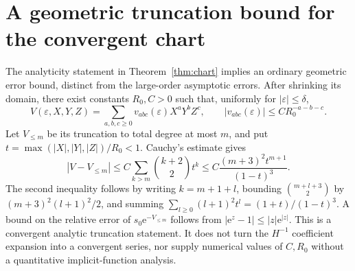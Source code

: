 \documentclass[11pt,a4paper]{article}
\numberwithin{equation}{section}
\theoremstyle{definition}
\theoremstyle{remark}
\newcommand{\eps}{\varepsilon}
\newcommand{\ee}{\mathrm e}
\begin{document}
\section{A geometric truncation bound for the convergent chart}
\label{app:chart}
The analyticity statement in Theorem~\ref{thm:chart} implies an ordinary
geometric error bound, distinct from the large-order asymptotic errors.
After shrinking its domain, there exist constants \(R_0,C>0\) such that,
uniformly for \(|\eps|\le\delta\),
\[
 V(\eps,X,Y,Z)=\sum_{a,b,c\ge0}v_{abc}(\eps)X^aY^bZ^c,
 \qquad |v_{abc}(\eps)|\le C R_0^{-a-b-c}.
\]
Let \(V_{\le m}\) be its truncation to total degree at most \(m\), and put
\(t=\max(|X|,|Y|,|Z|)/R_0<1\). Cauchy's estimate gives
\begin{equation}
 |V-V_{\le m}|\le
 C\sum_{k>m}\binom{k+2}{2}t^k
 \le C\frac{(m+3)^2t^{m+1}}{(1-t)^3}.
 \label{eq:geometric-tail}
\end{equation}
The second inequality follows by writing \(k=m+1+l\), bounding
\(\binom{m+l+3}{2}\) by \((m+3)^2(l+1)^2/2\), and summing
\(\sum_{l\ge0}(l+1)^2t^l=(1+t)/(1-t)^3\).
A bound on the relative error of \(s_0\ee^{-V_{\le m}}\) follows from
\(|\ee^z-1|\le |z|\ee^{|z|}\). This is a convergent analytic truncation
statement. It does not turn the \(H^{-1}\) coefficient expansion into a
convergent series, nor supply numerical values of \(C,R_0\) without a
quantitative implicit-function analysis.
\end{document}
